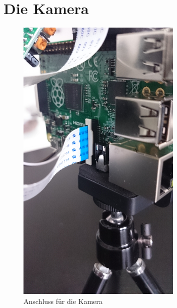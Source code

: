 \documentclass[12pt,a4paper]{scrreprt}
\begin{document}
\section{Die Kamera}
 \begin{figure}[h] \centering \includegraphics[width=7.9cm]{kamera.JPG} \caption{Anschluss für die Kamera} \end{figure}
\end{document}
